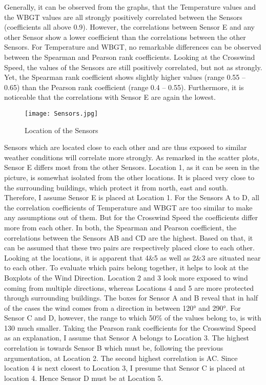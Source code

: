 \documentclass{article}
\begin{document}
Generally, it can be observed from the graphs, that the Temperature values and the WBGT values are all strongly positively correlated between the Sensors (coefficients all above 0.9). However, the correlations between Sensor E and any other Sensor show a lower coefficient than the correlations between the other Sensors. For Temperature and WBGT, no remarkable differences can be observed between the Spearman and Pearson rank coefficients. Looking at the Crosswind Speed, the values of the Sensors are still positively correlated, but not as strongly. Yet, the Spearman rank coefficient shows slightly higher values (range 0.55 – 0.65) than the Pearson rank coefficient (range 0.4 – 0.55). Furthermore, it is noticeable that the correlations with Sensor E are again the lowest.

\begin{figure} []
  \centering
  \texttt{[image: Sensors.jpg]}
  \caption{Location of the Sensors}
  \label{fig:Loaction}
\end{figure}

Sensors which are located close to each other and are thus exposed to similar weather conditions will correlate more strongly. As remarked in the scatter plots, Sensor E differs most from the other Sensors. Location 1, as it can be seen in the picture, is somewhat isolated from the other locations. It is placed very close to the surrounding buildings, which protect it from north, east and south. Therefore, I assume Sensor E is placed at Location 1. For the Sensors A to D, all the correlation coefficients of Temperature and WBGT are too similar to make any assumptions out of them. But for the Crosswind Speed the coefficients differ more from each other. In both, the Spearman and Pearson coefficient, the correlations between the Sensors AB and CD are the highest. Based on that, it can be assumed that these two pairs are respectively placed close to each other. Looking at the locations, it is apparent that 4\&5 as well as 2\&3 are situated near to each other. To evaluate which pairs belong together, it helps to look at the Boxplots of the Wind Direction. Location 2 and 3 look more exposed to wind coming from multiple directions, whereas Locations 4 and 5 are more protected through surrounding buildings. The boxes for Sensor A and B reveal that in half of the cases the wind comes from a direction in between \ang{120} and \ang{290}. For Sensor C and D, however, the range to which 50\% of the values belong to, is with 130 much smaller. Taking the Pearson rank coefficients for the Crosswind Speed as an explanation, I assume that Sensor A belongs to Location 3. The highest correlation is towards Sensor B which must be, following the previous argumentation, at Location 2. The second highest correlation is AC. Since location 4 is next closest to Location 3, I presume that Sensor C is placed at location 4. Hence Sensor D must be at Location 5.
\end{document}
